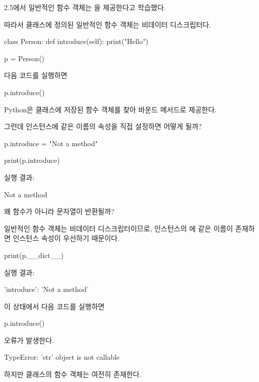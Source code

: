 2.5에서 일반적인 함수 객체는 을 제공한다고 학습했다.

따라서 클래스에 정의된 일반적인 함수 객체는 비데이터 디스크립터다.

\begin{dhkcode}
class Person:
    def introduce(self):
        print("Hello")


p = Person()
\end{dhkcode}

다음 코드를 실행하면

\begin{dhkcode}
p.introduce()
\end{dhkcode}

Python은 클래스에 저장된 함수 객체를 찾아 바운드 메서드로 제공한다.

그런데 인스턴스에 같은 이름의 속성을 직접 설정하면 어떻게 될까?

\begin{dhkcode}
p.introduce = "Not a method"

print(p.introduce)
\end{dhkcode}

실행 결과:

\begin{dhkzsh}
Not a method
\end{dhkzsh}

왜 함수가 아니라 문자열이 반환될까?

일반적인 함수 객체는 비데이터 디스크립터이므로, 인스턴스의 에 같은 이름이 존재하면 인스턴스 속성이 우선하기 때문이다.

\begin{dhkcode}
print(p.__dict__)
\end{dhkcode}

실행 결과:

\begin{dhkzsh}
{'introduce': 'Not a method'}
\end{dhkzsh}

이 상태에서 다음 코드를 실행하면

\begin{dhkcode}
p.introduce()
\end{dhkcode}

오류가 발생한다.

\begin{dhkzsh}
TypeError: 'str' object is not callable
\end{dhkzsh}

하지만 클래스의 함수 객체는 여전히 존재한다.

